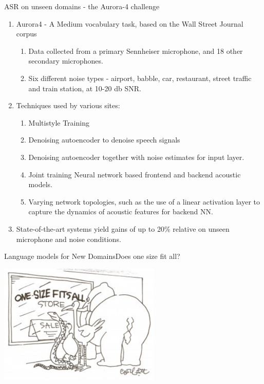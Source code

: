 \begin{frame}{ASR on unseen domains - the Aurora-4 challenge}

\begin{enumerate}
\item Aurora4 - A Medium vocabulary task, based on the Wall Street Journal corpus
\begin{enumerate}
\item Data collected from a primary Sennheiser microphone, and 18 other secondary microphones.
\item Six different noise types - airport, babble, car, restaurant, street traffic and train station, at 10-20 db SNR.
\end{enumerate}
\item Techniques used by various sites:
\begin{enumerate}
\item Multistyle Training
\item Denoising autoencoder to denoise speech signals
\item Denoising autoencoder together with noise estimates for input layer.
\item Joint training Neural network based frontend and backend acoustic models. 
\item Varying network topologies, such as the use of a linear activation layer to capture the dynamics of acoustic features for backend NN.
\end{enumerate}
\item State-of-the-art systems yield gains of up to 20\% relative on unseen microphone and noise conditions.
\end{enumerate}
\end{frame}


\begin{frame} {Language models for New Domains}{Does one size fit all?}
  \begin{center}
    \includegraphics[width=77mm]{figures/onesize.pdf}
  \end{center}
\end{frame}

